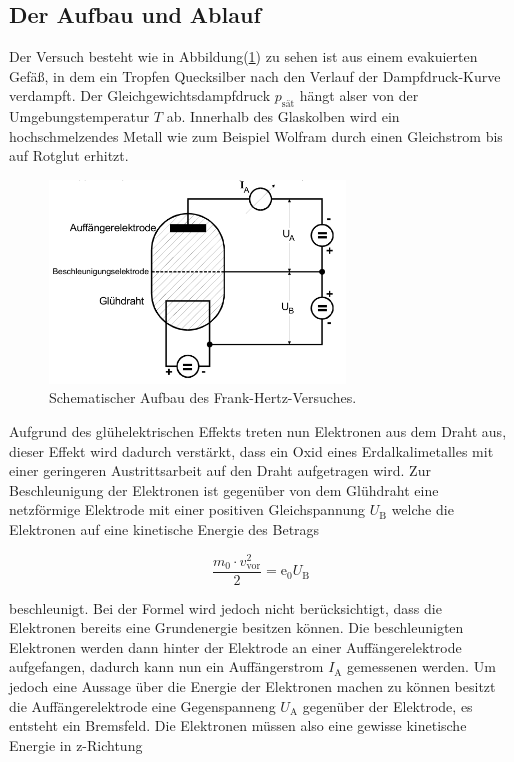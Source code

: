     \subsection{Der Aufbau und Ablauf}

        \noindent Der Versuch besteht wie in Abbildung(\ref{img:aufb}) zu sehen ist aus einem evakuierten Gefäß, in dem ein Tropfen Quecksilber 
        nach den Verlauf der Dampfdruck-Kurve verdampft. Der Gleichgewichtsdampfdruck $p_\text{sät}$ hängt alser von der Umgebungstemperatur $T$ ab.
        Innerhalb des Glaskolben wird ein hochschmelzendes Metall wie zum Beispiel Wolfram durch einen Gleichstrom bis auf Rotglut erhitzt.
        
        \begin{figure}[ht]
            \centering
            \includegraphics[width=0.7\textwidth]{latex/images/Aufbau.PNG}
            \caption{Schematischer Aufbau des Frank-Hertz-Versuches.}
            \label{img:aufb}
        \end{figure}

        \noindent Aufgrund des glühelektrischen Effekts treten nun Elektronen aus dem Draht aus, dieser Effekt wird dadurch verstärkt, dass ein 
        Oxid eines Erdalkalimetalles mit einer geringeren Austrittsarbeit auf den Draht aufgetragen wird. Zur Beschleunigung der Elektronen ist 
        gegenüber von dem Glühdraht eine netzförmige Elektrode mit einer positiven Gleichspannung $U_{\text{B}}$ welche die Elektronen auf eine 
        kinetische Energie des Betrags

        \begin{equation*}
            \frac{m_0 \cdot v_{\text{vor}}^2}{2} = \text{e}_0 U_\text{B}
        \end{equation*}

        \noindent beschleunigt. Bei der Formel wird jedoch nicht berücksichtigt, dass die Elektronen bereits eine Grundenergie besitzen können.
        Die beschleunigten Elektronen werden dann hinter der Elektrode an einer Auffängerelektrode aufgefangen, dadurch kann nun ein 
        Auffängerstrom $I_\text{A}$ gemessenen werden. Um jedoch eine Aussage über die Energie der Elektronen machen zu können besitzt die 
        Auffängerelektrode eine Gegenspanneng $U_{\text{A}}$ gegenüber der Elektrode, es entsteht ein Bremsfeld. Die Elektronen müssen also 
        eine gewisse kinetische Energie in z-Richtung
        
